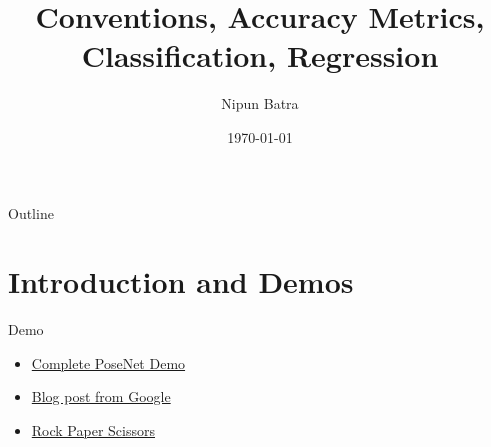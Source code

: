 \documentclass[usenames,dvipsnames]{beamer}
\title{Conventions, Accuracy Metrics, Classification, Regression}
\date{\today}
\author{Nipun Batra}
\institute{IIT Gandhinagar}
\begin{document}
%

  \setcounter{popquiz}{0}

  \maketitle
  
  \begin{frame}{Outline}
    \tableofcontents
  \end{frame}
  
  \section{Introduction and Demos}
  
  \begin{frame}{Demo}
	\begin{itemize}
		\item \href{https://storage.googleapis.com/tfjs-models/demos/posenet/camera.html}{Complete PoseNet Demo}
		\item \href{https://blog.tensorflow.org/2018/05/real-time-human-pose-estimation-in.html}{Blog post from Google}
		\item \href{https://rps-tfjs.netlify.app}{Rock Paper Scissors}
	\end{itemize}
  \end{frame}
  
\end{document}
